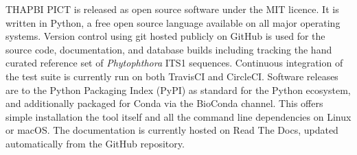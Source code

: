 \documentclass[10pt,oneside]{article}
\begin{document}
THAPBI PICT is released as open source software under the MIT licence. It is written in Python, a free open source language available on all major operating systems. Version control using git hosted publicly on GitHub is used for the source code, documentation, and database builds including tracking the hand curated reference set of \textit{Phytophthora} ITS1 sequences. Continuous integration of the test suite is currently run on both TravisCI and CircleCI. Software releases are to the Python Packaging Index (PyPI) as standard for the Python ecosystem, and additionally packaged for Conda via the BioConda channel. This offers simple installation the tool itself and all the command line dependencies on Linux or macOS. The documentation is currently hosted on Read The Docs, updated automatically from the GitHub repository.
\end{document}
